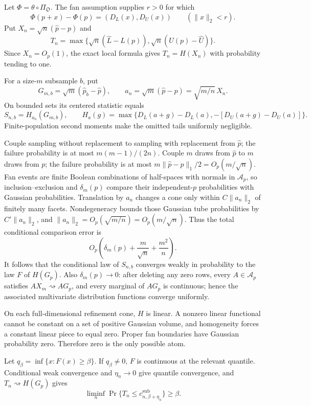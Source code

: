Let \(\Phi=\theta\circ\Pi_{\mathfrak O}\).  The fan assumption supplies \(r>0\) for which
\[
\Phi(p+x)-\Phi(p)=(D_L(x),D_U(x))\qquad(\|x\|_2<r).
\]
Put \(X_n=\sqrt n(\widehat p-p)\) and
\[
T_n=\max\{\sqrt n(\widehat L-L(p)),\sqrt n(U(p)-\widehat U)\}.
\]
Since \(X_n=O_p(1)\), the exact local formula gives \(T_n=H(X_n)\) with probability tending to one.

For a size-\(m\) subsample \(b\), put
\[
G_{m,b}=\sqrt m(\widehat p_b-\widehat p),\qquad
a_n=\sqrt m(\widehat p-p)=\sqrt{m/n}\,X_n.
\]
On bounded sets its centered statistic equals
\[
S_{n,b}=H_{a_n}(G_{m,b}),\qquad
H_a(g)=\max\{D_L(a+g)-D_L(a),-[D_U(a+g)-D_U(a)]\}.
\]
Finite-population second moments make the omitted tails uniformly negligible.

Couple sampling without replacement to sampling with replacement from \(\widehat p\); the failure probability is at most \(m(m-1)/(2n)\).  Couple \(m\) draws from \(\widehat p\) to \(m\) draws from \(p\); the failure probability is at most \(m\|\widehat p-p\|_1/2=O_p(m/\sqrt n)\).  Fan events are finite Boolean combinations of half-spaces with normals in \(\mathcal A_p\), so inclusion--exclusion and \(\delta_m(p)\) compare their independent-\(p\) probabilities with Gaussian probabilities.  Translation by \(a_n\) changes a cone only within \(C\|a_n\|_2\) of finitely many facets.  Nondegeneracy bounds those Gaussian tube probabilities by \(C'\|a_n\|_2\), and \(\|a_n\|_2=O_p(\sqrt{m/n})=O_p(m/\sqrt n)\).  Thus the total conditional comparison error is
\[
O_p\!\left(\delta_m(p)+\frac m{\sqrt n}+\frac{m^2}{n}\right).
\]
It follows that the conditional law of \(S_{n,b}\) converges weakly in probability to the law \(F\) of \(H(G_p)\).  Also \(\delta_m(p)\to0\): after deleting any zero rows, every \(A\in\mathcal A_p\) satisfies \(AX_m\rightsquigarrow AG_p\), and every marginal of \(AG_p\) is continuous; hence the associated multivariate distribution functions converge uniformly.

On each full-dimensional refinement cone, \(H\) is linear.  A nonzero linear functional cannot be constant on a set of positive Gaussian volume, and homogeneity forces a constant linear piece to equal zero.  Proper fan boundaries have Gaussian probability zero.  Therefore zero is the only possible atom.

Let \(q_\beta=\inf\{x:F(x)\geq\beta\}\).  If \(q_\beta\neq0\), \(F\) is continuous at the relevant quantile.  Conditional weak convergence and \(\eta_n\to0\) give quantile convergence, and \(T_n\rightsquigarrow H(G_p)\) gives
\[
\liminf_n\Pr\{T_n\leq c^{\mathrm{sub}}_{n,\beta+\eta_n}\}\geq\beta.
\]

